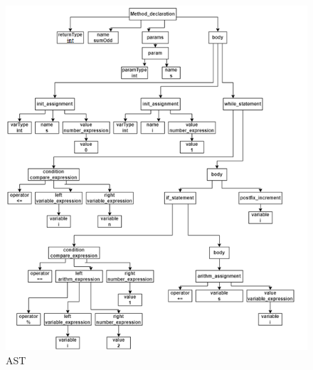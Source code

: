 \newpage
\begin{figure}[h]
	\center
	\includegraphics [scale=1] {my_folder/images/my/2}
	\caption{AST}
	\label{fig:2}  
\end{figure}

